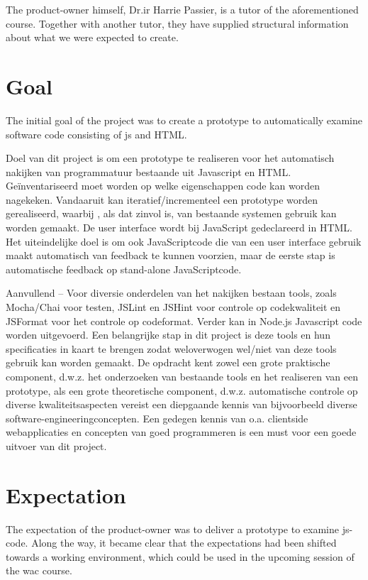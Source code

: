 The product-owner himself, Dr.ir Harrie Passier, is a tutor of the aforementioned course.
Together with another tutor, they have supplied structural information about
what we were expected to create.


\section{Goal}
The initial goal of the project was to create a prototype to automatically examine
software code consisting of \gls{js} and HTML.

Doel van dit project is om een prototype te realiseren voor het automatisch nakijken van programmatuur bestaande uit Javascript en HTML. Geïnventariseerd moet worden op welke eigenschappen code kan worden nagekeken. Vandaaruit kan iteratief/incrementeel een prototype worden gerealiseerd, waarbij , als dat zinvol is, van bestaande systemen gebruik kan worden gemaakt.
De user interface wordt bij JavaScript gedeclareerd in HTML. Het uiteindelijke doel is om ook JavaScriptcode die van een user interface gebruik maakt automatisch van feedback te kunnen voorzien, maar de eerste stap is automatische feedback op stand-alone JavaScriptcode.

Aanvullend – Voor diversie onderdelen van het nakijken bestaan tools, zoals Mocha/Chai voor testen, JSLint en JSHint voor controle op codekwaliteit en JSFormat voor het controle op codeformat. Verder kan in Node.js Javascript code worden uitgevoerd. Een belangrijke stap in dit project is deze tools en hun specificaties in kaart te brengen zodat weloverwogen wel/niet van deze tools gebruik kan worden gemaakt.
De opdracht kent zowel een grote praktische component, d.w.z. het onderzoeken van bestaande tools en het realiseren van een prototype, als een grote theoretische component, d.w.z. automatische controle op diverse kwaliteitsaspecten vereist een diepgaande kennis van bijvoorbeeld diverse software-engineeringconcepten.
Een gedegen kennis van o.a. clientside webapplicaties en concepten van goed programmeren is een must voor een goede uitvoer van dit project.

\section{Expectation}

The expectation of the product-owner was to deliver a prototype to examine \gls{js-code}.
Along the way, it became clear that the expectations had been shifted towards a working environment, which could be used in the upcoming session of the \gls{wac} course.

